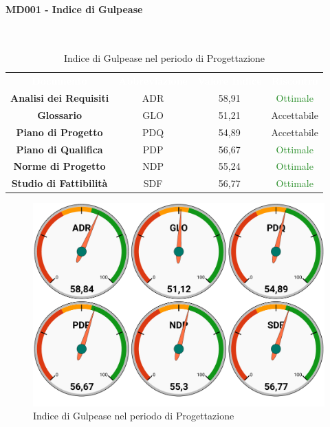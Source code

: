 \paragraph{MD001 - Indice di Gulpease}\mbox{}\\[0,3cm]
\begin{table}[H]
	\centering
	\begin{tabular}{cccc}
	\rowcolor{greySWEight}
	\textcolor{white}{\textbf{Documento}} & 
	\textcolor{white}{\textbf{Abbreviazione}} &
	\textcolor{white}{\textbf{Valore Indice}}&
	\textcolor{white}{\textbf{Riscontro}}\\
	
	\textbf{Analisi dei Requisiti} & ADR & 58,91 & \textcolor{ForestGreen}{Ottimale} \\
	\textbf{Glossario} & GLO & 51,21 & \textcolor{YellowOrange}{Accettabile} \\
	\textbf{Piano di Progetto} & PDQ & 54,89 & \textcolor{YellowOrange}{Accettabile} \\
	\textbf{Piano di Qualifica} & PDP & 56,67 & \textcolor{ForestGreen}{Ottimale} \\
	\textbf{Norme di Progetto} & NDP & 55,24 & \textcolor{ForestGreen}{Ottimale} \\
	\textbf{Studio di Fattibilità} & SDF & 56,77 & \textcolor{ForestGreen}{Ottimale} \\

	\end{tabular}
	\caption{Indice di Gulpease nel periodo di Progettazione}
\end{table}
\begin{figure}[H]
	\includegraphics[width=1\linewidth]{sez/App_Esito/Progettazione/graph/PR_Gulp.pdf}
	\caption{Indice di Gulpease nel periodo di Progettazione}
\end{figure}

